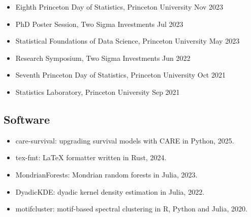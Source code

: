 \documentclass{wgu-cv}
\begin{document}
\begin{itemize}
  \item Eighth Princeton Day of Statistics,
    Princeton University
    \hfill Nov 2023

  \item PhD Poster Session,
    Two Sigma Investments
    \hfill Jul 2023

  \item Statistical Foundations of Data Science,
    Princeton University
    \hfill May 2023

  \item Research Symposium,
    Two Sigma Investments
    \hfill Jun 2022

  \item Seventh Princeton Day of Statistics,
    Princeton University
    \hfill Oct 2021

  \item Statistics Laboratory,
    Princeton University
    \hfill Sep 2021

\end{itemize}

\subsection{Software}{}
\begin{itemize}

  \item care-survival: upgrading survival models with CARE in Python, 2025. \\

  \item tex-fmt: LaTeX formatter written in Rust, 2024.

  \item MondrianForests: Mondrian random forests in Julia, 2023. \\

  \item DyadicKDE: dyadic kernel density estimation in Julia, 2022. \\

  \item motifcluster: motif-based spectral clustering
    in R, Python and Julia, 2020. \\

\end{itemize}

\vspace*{3mm}
\end{document}

